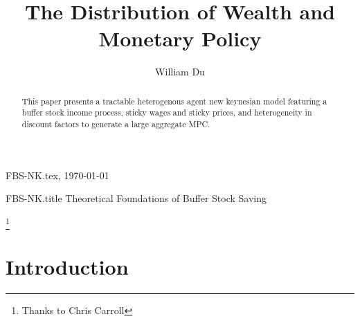 \documentclass[titlepage]{\econtex}\providecommand{\texname}{FBS-NK}
\providecommand{\onlyinsubfile}{}
\providecommand{\notinsubfile}{}
\renewcommand{\onlyinsubfile}[1]{}
\renewcommand{\notinsubfile}[1]{#1}
\begin{document}

\renewcommand{\onlyinsubfile}[1]{}\renewcommand{\notinsubfile}[1]{#1} 

\hfill{\tiny \texname.tex, \today}

\begin{verbatimwrite}{\texname.title}
Theoretical Foundations of Buffer Stock Saving
\end{verbatimwrite}


\title{The Distribution of Wealth and Monetary Policy}

\author{William Du\authNum}





\maketitle 


\hypertarget{abstract}{}
\begin{abstract}
  This paper presents a tractable heterogenous agent new keynesian model featuring a buffer stock income process,  sticky wages and sticky prices, and heterogeneity in discount factors to generate a large aggregate MPC.
\end{abstract}


\begin{authorsinfo}
\end{authorsinfo}

\thanks{Thanks to Chris Carroll }

\titlepagefinish


\newtheorem{defn}{Definition}
\newtheorem{theorem}{Theorem}

\hypertarget{Introduction}{}
\section{Introduction}

\label{sec:intro}
\end{document}

